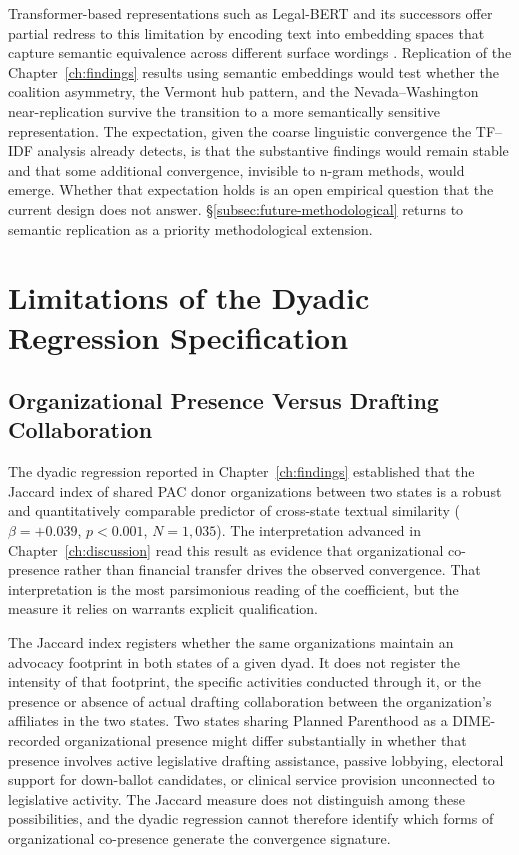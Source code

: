 Transformer-based representations such as Legal-BERT and its successors offer partial redress to this limitation by encoding text into embedding spaces that capture semantic equivalence across different surface wordings \parencite{chalkidis-etal-2020-legal}. Replication of the Chapter~\ref{ch:findings} results using semantic embeddings would test whether the coalition asymmetry, the Vermont hub pattern, and the Nevada--Washington near-replication survive the transition to a more semantically sensitive representation. The expectation, given the coarse linguistic convergence the TF--IDF analysis already detects, is that the substantive findings would remain stable and that some additional convergence, invisible to n-gram methods, would emerge. Whether that expectation holds is an open empirical question that the current design does not answer. \S\ref{subsec:future-methodological} returns to semantic replication as a priority methodological extension.

\section{Limitations of the Dyadic Regression Specification}
\label{sec:limits-dyadic}

\subsection{Organizational Presence Versus Drafting Collaboration}
\label{subsec:jaccard-limits}
The dyadic regression reported in Chapter~\ref{ch:findings} established that the Jaccard index of shared PAC donor organizations between two states is a robust and quantitatively comparable predictor of cross-state textual similarity ($\beta = +0.039$, $p < 0.001$, $N = 1{,}035$). The interpretation advanced in Chapter~\ref{ch:discussion} read this result as evidence that organizational co-presence rather than financial transfer drives the observed convergence. That interpretation is the most parsimonious reading of the coefficient, but the measure it relies on warrants explicit qualification.

The Jaccard index registers whether the same organizations maintain an advocacy footprint in both states of a given dyad. It does not register the intensity of that footprint, the specific activities conducted through it, or the presence or absence of actual drafting collaboration between the organization's affiliates in the two states. Two states sharing Planned Parenthood as a DIME-recorded organizational presence might differ substantially in whether that presence involves active legislative drafting assistance, passive lobbying, electoral support for down-ballot candidates, or clinical service provision unconnected to legislative activity. The Jaccard measure does not distinguish among these possibilities, and the dyadic regression cannot therefore identify which forms of organizational co-presence generate the convergence signature.


